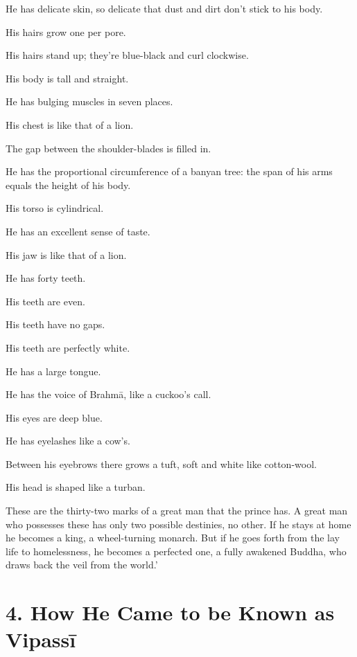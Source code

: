 \documentclass[12pt,openany]{book}%
\begin{document}
He has delicate skin, so delicate that dust and dirt don’t stick to his body. 

His hairs grow one per pore. 

His hairs stand up; they’re blue-black and curl clockwise. 

His body is tall and straight. 

He has bulging muscles in seven places. 

His chest is like that of a lion. 

The gap between the shoulder-blades is filled in. 

He has the proportional circumference of a banyan tree: the span of his arms equals the height of his body. 

His torso is cylindrical. 

He has an excellent sense of taste. 

His jaw is like that of a lion. 

He has forty teeth. 

His teeth are even. 

His teeth have no gaps. 

His teeth are perfectly white. 

He has a large tongue. 

He has the voice of \textsanskrit{Brahmā}, like a cuckoo’s call. 

His eyes are deep blue. 

He has eyelashes like a cow’s. 

Between his eyebrows there grows a tuft, soft and white like cotton-wool. 

His head is shaped like a turban. 

These are the thirty-two marks of a great man that the prince has. A great man who possesses these has only two possible destinies, no other. If he stays at home he becomes a king, a wheel-turning monarch. But if he goes forth from the lay life to homelessness, he becomes a perfected one, a fully awakened Buddha, who draws back the veil from the world.’ 

\section*{4. How He Came to be Known as \textsanskrit{Vipassī} }
\end{document}
